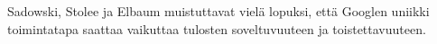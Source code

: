 \documentclass[finnish]{../tktltiki2}
\theoremstyle{definition}
\theoremstyle{remark}
\begin{document}
Sadowski, Stolee ja Elbaum muistuttavat vielä lopuksi, että Googlen uniikki toimintatapa saattaa vaikuttaa tulosten soveltuvuuteen ja toistettavuuteen.

%
%
% 
%






%
\end{document}
